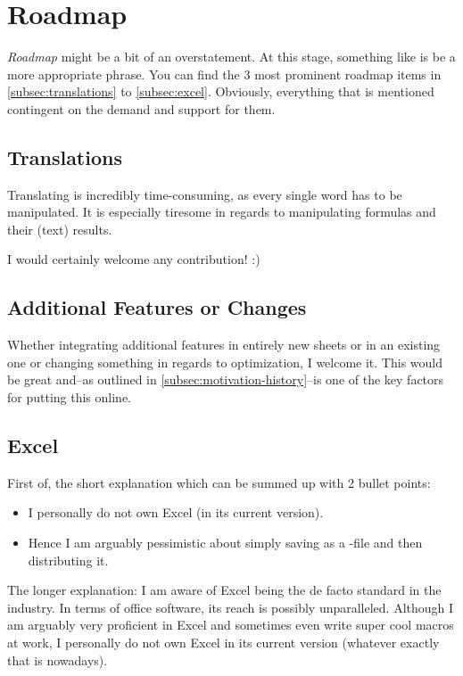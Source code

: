 \section{Roadmap}
\label{sec:roadmap}

\emph{Roadmap} might be a bit of an overstatement.
At this stage, something like  is be a more appropriate phrase.
You can find the 3 most prominent roadmap items in \autoref{subsec:translations} to \autoref{subsec:excel}.
Obviously, everything that is mentioned contingent on the demand and support for them.

\subsection{Translations}
\label{subsec:translations}

Translating \tfn is incredibly time-consuming, as every single word has to be manipulated.
It is especially tiresome in regards to manipulating formulas and their (text) results.

I would certainly welcome any contribution! :)

\subsection{Additional Features or Changes}
\label{subsec:additional-features}

Whether integrating additional features in entirely new sheets or in an existing one or changing something in regards to optimization, I welcome it.
This would be great and--as outlined in \autoref{subsec:motivation-history}--is one of the key factors for putting this online.

\subsection{Excel}
\label{subsec:excel}

First of, the short explanation which can be summed up with 2 bullet points:
\begin{itemize}
	\item I personally do not own Excel (in its current version).
	\item Hence I am arguably pessimistic about simply saving \tfn as a -file and then distributing it.
\end{itemize}

The longer explanation:
I am aware of Excel being the de facto standard in the industry.
In terms of office software, its reach is possibly unparalleled.
Although I am arguably very proficient in Excel and sometimes even write super cool macros at work, I personally do not own Excel in its current version (whatever exactly that is nowadays).


